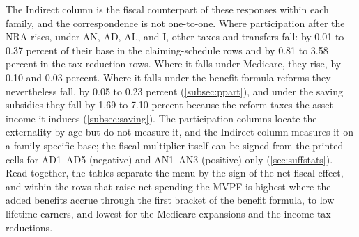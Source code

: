 The Indirect column is the fiscal counterpart of these responses within each family, and the correspondence is not one-to-one. Where participation after the NRA rises, under AN, AD, AL, and I, other taxes and transfers fall: by 0.01 to 0.37 percent of their base in the claiming-schedule rows and by 0.81 to 3.58 percent in the tax-reduction rows. Where it falls under Medicare, they rise, by 0.10 and 0.03 percent. Where it falls under the benefit-formula reforms they nevertheless fall, by 0.05 to 0.23 percent (\autoref{subsec:ppart}), and under the saving subsidies they fall by 1.69 to 7.10 percent because the reform taxes the asset income it induces (\autoref{subsec:saving}). %
The participation columns locate the externality by age but do not measure it, and the Indirect column measures it on a family-specific base; the fiscal multiplier itself can be signed from the printed cells for AD1--AD5 (negative) and AN1--AN3 (positive) only (\autoref{sec:suffstats}). Read together, the tables separate the menu by the sign of the net fiscal effect, and within the rows that raise net spending the MVPF is highest where the added benefits accrue through the first bracket of the benefit formula, to low lifetime earners, and lowest for the Medicare expansions and the income-tax reductions. %


